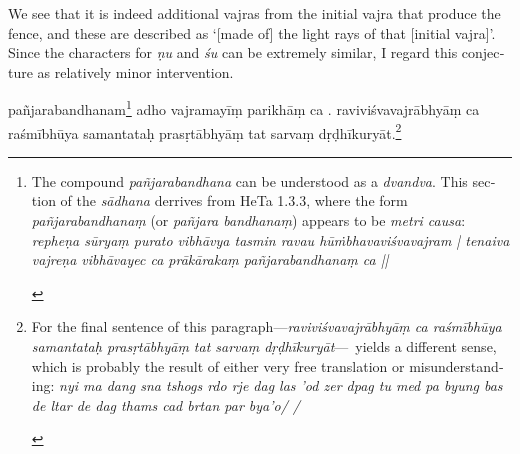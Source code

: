 \documentclass[naipra.tex]{subfiles}
\begin{document}
\begin{sanskrit}
{\begin{english}
		\noindent We see that it is indeed additional vajras from the initial vajra that produce the fence, and these are described as `[made of] the light rays of that [initial vajra]'.
		Since the characters for \emph{ṇu} and \emph{śu} can be extremely similar, I regard this conjecture as relatively minor intervention.
	\end{english}
}  pañjarabandhanam\footnote{
	\begin{english}%
		The compound \emph{pañjarabandhana} can be understood as a \emph{dvandva}.
		This section of the \emph{sādhana} derrives from HeTa 1.3.3, where the form \emph{pañjarabandhanaṃ} (or \emph{pañjara bandhanaṃ}) appears to be \emph{metri causa}: \emph{repheṇa sūryaṃ purato vibhāvya tasmin ravau hūṁbhavaviśvavajram | tenaiva vajreṇa vibhāvayec ca prākārakaṃ pañjarabandhanaṃ ca ||}
	\end{english}
} adho vajramayīṃ  parikhāṃ ca .
raviviśvavajrābhyāṃ ca raśmībhūya samantataḥ prasṛtābhyāṃ tat sarvaṃ dṛḍhīkuryāt.\footnote{
	\begin{english}%
		For the final sentence of this paragraph—\emph{raviviśvavajrābhyāṃ ca raśmībhūya samantataḥ prasṛtābhyāṃ tat sarvaṃ dṛḍhīkuryāt}—\TIB\ yields a different sense, which is probably the result of either very free translation or misunderstanding: \emph{nyi ma dang sna tshogs rdo rje dag las 'od zer dpag tu med pa byung bas de ltar de dag thams cad brtan par bya'o/ /}
	\end{english}
}
\pend




\end{sanskrit}
\end{document}
